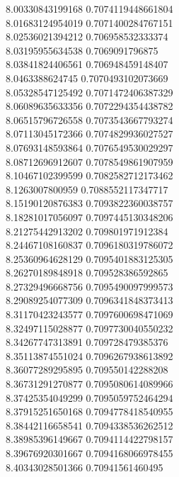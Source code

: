{8.00330843199168 0.7074119448661804 \\
8.01683124954019 0.7071400284767151 \\
8.02536021394212 0.706958532333374 \\
8.03195955634538 0.7069091796875 \\
8.03841824406561 0.706948459148407 \\
8.0463388624745 0.7070493102073669 \\
8.05328547125492 0.7071472406387329 \\
8.06089635633356 0.7072294354438782 \\
8.06515796726558 0.7073543667793274 \\
8.07113045172366 0.7074829936027527 \\
8.07693148593864 0.7076549530029297 \\
8.08712696912607 0.7078549861907959 \\
8.10467102399599 0.7082582712173462 \\
8.1263007800959 0.7088552117347717 \\
8.15190120876383 0.7093822360038757 \\
8.18281017056097 0.7097445130348206 \\
8.21275442913202 0.709801971912384 \\
8.24467108160837 0.7096180319786072 \\
8.25360964628129 0.7095401883125305 \\
8.26270189848918 0.709528386592865 \\
8.27329496668756 0.7095490097999573 \\
8.29089254077309 0.7096341848373413 \\
8.31170423243577 0.7097600698471069 \\
8.32497115028877 0.7097730040550232 \\
8.34267747313891 0.709728479385376 \\
8.35113874551024 0.7096267938613892 \\
8.36077289295895 0.709550142288208 \\
8.36731291270877 0.7095080614089966 \\
8.37425354049299 0.7095059752464294 \\
8.37915251650168 0.7094778418540955 \\
8.38442116658541 0.7094338536262512 \\
8.38985396149667 0.7094114422798157 \\
8.39676920301667 0.7094168066978455 \\
8.40343028501366 0.70941561460495 \\
}
